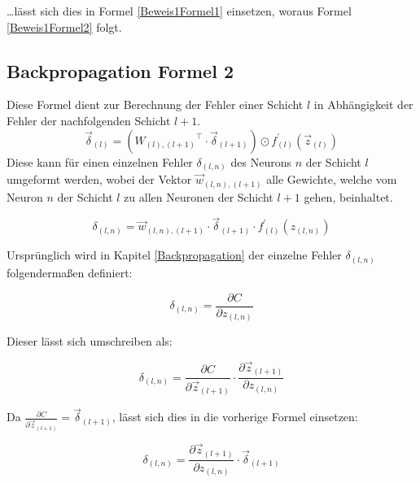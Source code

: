 \documentclass[a4paper,12pt,ngerman,oneside]{scrreprt}	%
\begin{document}
			…lässt sich dies in Formel \ref{Beweis1Formel1} einsetzen, woraus Formel \ref{Beweis1Formel2} folgt.
			
			
			
			\subsection*{Backpropagation Formel 2}
			Diese Formel dient zur Berechnung der Fehler einer Schicht $l$ in Abhängigkeit der Fehler der nachfolgenden Schicht $l+1$.
			\begin{equation}
			\vec{\delta}_{(l)} = ({W_{(l),(l+1)}}^\intercal \cdot \vec{\delta}_{(l+1)}) \odot f_{(l)}^{\prime} (\vec{z}_{(l)})
			\end{equation}
			Diese kann für einen einzelnen Fehler $\delta_{(l,n)}$ des Neurons $n$ der Schicht $l$ umgeformt werden, wobei der Vektor $\vec{w}_{(l,n),(l+1)}$ alle Gewichte, welche vom Neuron $n$ der Schicht $l$ zu allen Neuronen der Schicht $l+1$ gehen, beinhaltet.
			
			\begin{equation}\label{Beweis2Formel2}
				\delta_{(l,n)} = \vec{w}_{(l,n),(l+1)} \cdot \vec{\delta}_{(l+1)} \cdot f_{(l)}^{\prime} (z_{(l,n)})
			\end{equation}
			
			Ursprünglich wird in Kapitel \ref{Backpropagation} der einzelne Fehler $\delta_{(l,n)}$ folgendermaßen definiert:
			
			\begin{equation}
				\delta_{(l,n)} = \frac{\partial C}{\partial z_{(l,n)}}
			\end{equation}
			
			Dieser lässt sich umschreiben als:
			
			\begin{equation}
				\delta_{(l,n)} = \frac{\partial C}{\partial \vec{z}_{(l+1)}} \cdot \frac{\partial \vec{z}_{(l+1)}}{\partial z_{(l,n)}}
			\end{equation}
			
			Da $\frac{\partial C}{\partial \vec{z}_{(l+1)}} = \vec{\delta}_{(l+1)}$, lässt sich dies in die vorherige Formel einsetzen:
			
			\begin{equation}\label{Beweis2Formel1}
				\delta_{(l,n)} = \frac{\partial \vec{z}_{(l+1)}}{\partial z_{(l,n)}} \cdot \vec{\delta}_{(l+1)}
			\end{equation}
			
\end{document}
